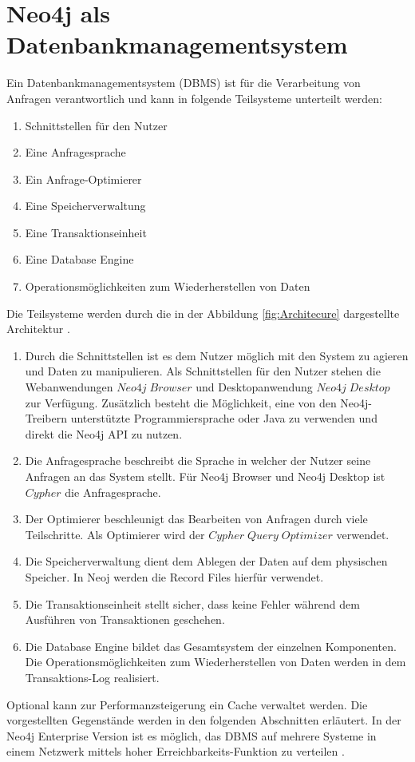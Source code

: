 \section{Neo4j als Datenbankmanagementsystem}
Ein Datenbankmanagementsystem (DBMS) ist für die Verarbeitung von Anfragen verantwortlich und kann in folgende Teilsysteme unterteilt werden\parencite{angles2012comparison}:
\begin{enumerate}
	\item Schnittstellen für den Nutzer
	\item Eine Anfragesprache
	\item Ein Anfrage-Optimierer
	\item Eine Speicherverwaltung
	\item Eine Transaktionseinheit
	\item Eine Database Engine
	\item Operationsmöglichkeiten zum Wiederherstellen von Daten
\end{enumerate}
Die Teilsysteme werden durch die in der Abbildung \ref{fig:Architecure} dargestellte Architektur .
\begin{enumerate}
	\item Durch die Schnittstellen ist es dem Nutzer möglich mit den System zu agieren und Daten zu manipulieren. Als Schnittstellen für den Nutzer stehen die Webanwendungen $Neo4j\; Browser$ und Desktopanwendung $Neo4j\; Desktop$ zur Verfügung. Zusätzlich besteht die Möglichkeit, eine von den Neo4j-Treibern unterstützte Programmiersprache  oder  Java zu verwenden und direkt die Neo4j API zu nutzen. 
	\item
	Die Anfragesprache  beschreibt die Sprache in welcher der Nutzer seine Anfragen an das System stellt. Für Neo4j Browser und Neo4j Desktop ist $Cypher$  die Anfragesprache.
	\item Der Optimierer beschleunigt das Bearbeiten von Anfragen durch viele Teilschritte. Als Optimierer wird der $Cypher\; Query\; Optimizer$ verwendet. 
	\item Die Speicherverwaltung dient dem Ablegen der Daten auf dem physischen Speicher. In Neoj werden die Record Files hierfür verwendet.
	\item Die Transaktionseinheit stellt sicher, dass keine Fehler während dem Ausführen von Transaktionen geschehen. 
	\item Die Database Engine bildet das Gesamtsystem der einzelnen Komponenten. Die Operationsmöglichkeiten zum Wiederherstellen von Daten werden in dem Transaktions-Log realisiert.
\end{enumerate}
Optional kann zur  Performanzsteigerung ein Cache verwaltet werden. Die vorgestellten Gegenstände werden in den folgenden Abschnitten erläutert. In der Neo4j Enterprise Version ist es möglich, das DBMS auf mehrere Systeme in einem Netzwerk mittels hoher Erreichbarkeits-Funktion zu verteilen \parencite{vukotic2015neo4j}.

